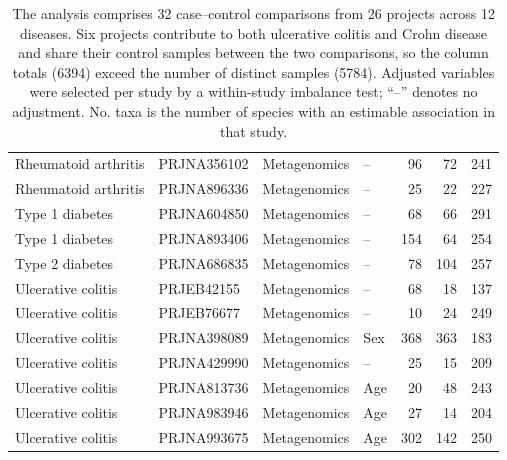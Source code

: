 \begin{table}[H]
{\begin{tabular}{llllrrr}
Rheumatoid arthritis & PRJNA356102 & Metagenomics & -- &  96 &  72 & 241 \\
Rheumatoid arthritis & PRJNA896336 & Metagenomics & -- &  25 &  22 & 227 \\
Type 1 diabetes & PRJNA604850 & Metagenomics & -- &  68 &  66 & 291 \\
Type 1 diabetes & PRJNA893406 & Metagenomics & -- & 154 &  64 & 254 \\
Type 2 diabetes & PRJNA686835 & Metagenomics & -- &  78 & 104 & 257 \\
Ulcerative colitis & PRJEB42155 & Metagenomics & -- &  68 &  18 & 137 \\
Ulcerative colitis & PRJEB76677 & Metagenomics & -- &  10 &  24 & 249 \\
Ulcerative colitis & PRJNA398089 & Metagenomics & Sex & 368 & 363 & 183 \\
Ulcerative colitis & PRJNA429990 & Metagenomics & -- &  25 &  15 & 209 \\
Ulcerative colitis & PRJNA813736 & Metagenomics & Age &  20 &  48 & 243 \\
Ulcerative colitis & PRJNA983946 & Metagenomics & Age &  27 &  14 & 204 \\
Ulcerative colitis & PRJNA993675 & Metagenomics & Age & 302 & 142 & 250 \\
\bottomrule
\end{tabular}
}
\caption*{\footnotesize The analysis comprises 32 case--control comparisons from 26 projects across 12 diseases. Six projects contribute to both ulcerative colitis and Crohn disease and share their control samples between the two comparisons, so the column totals (6394) exceed the number of distinct samples (5784). Adjusted variables were selected per study by a within-study imbalance test; ``--'' denotes no adjustment. No. taxa is the number of species with an estimable association in that study.}
\end{table}
